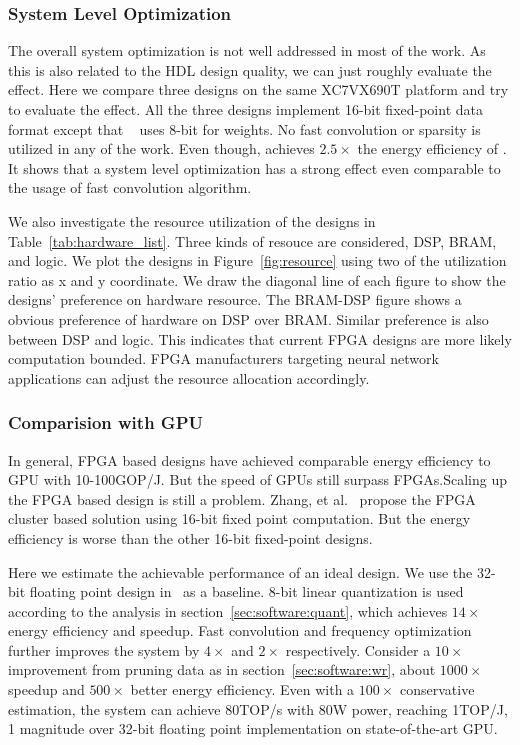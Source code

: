 \subsubsection{System Level Optimization} The overall system optimization is not well addressed in most of the work. As this is also related to the HDL design quality, we can just roughly evaluate the effect. Here we compare three designs\cite{zhang2016caffeine, liu2016automatic, li2016high} on the same XC7VX690T platform and try to evaluate the effect. All the three designs implement 16-bit fixed-point data format except that ~\cite{liu2016automatic} uses 8-bit for weights. No fast convolution or sparsity is utilized in any of the work. Even though, \cite{li2016high} achieves $2.5\times$ the energy efficiency of \cite{liu2016automatic}. It shows that a system level optimization has a strong effect even comparable to the usage of fast convolution algorithm. 

We also investigate the resource utilization of the designs in Table~\ref{tab:hardware_list}. Three kinds of resouce are considered, DSP, BRAM, and logic. We plot the designs in Figure~\ref{fig:resource} using two of the utilization ratio as x and y coordinate. We draw the diagonal line of each figure to show the designs' preference on hardware resource. The BRAM-DSP figure shows a obvious preference of hardware on DSP over BRAM. Similar preference is also between DSP and logic. This indicates that current FPGA designs are more likely computation bounded. FPGA manufacturers targeting neural network applications can adjust the resource allocation accordingly.

\subsubsection{Comparision with GPU} In general, FPGA based designs have achieved comparable energy efficiency to GPU with 10-100GOP/J. But the speed of GPUs still surpass FPGAs.Scaling up the FPGA based design is still a problem. Zhang, et al.~\cite{zhang2016energy} propose the FPGA cluster based solution using 16-bit fixed point computation. But the energy efficiency is worse than the other 16-bit fixed-point designs. 

Here we estimate the achievable performance of an ideal design. We use the 32-bit floating point design in~\cite{zhang2017improving} as a baseline. 8-bit linear quantization is used according to the analysis in section~\ref{sec:software:quant}, which achieves $14\times$ energy efficiency and speedup. Fast convolution and frequency optimization further improves the system by $4\times$ and $2\times$ respectively. Consider a $10\times$ improvement from pruning data as in section~\ref{sec:software:wr}, about $1000\times$ speedup and $500\times$ better energy efficiency. Even with a $100\times$ conservative estimation, the system can achieve  80TOP/s with 80W power, reaching 1TOP/J, 1 magnitude over 32-bit floating point implementation on state-of-the-art GPU. 

